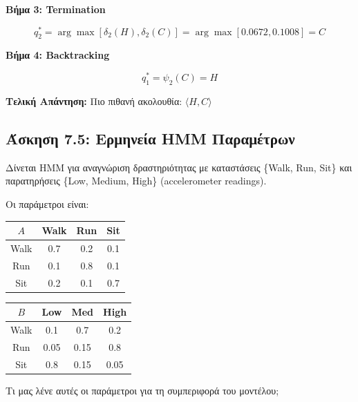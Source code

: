 \textbf{Βήμα 3: Termination}

$$q_2^* = \arg\max[\delta_2(H), \delta_2(C)] = \arg\max[0.0672, 0.1008] = C$$

\textbf{Βήμα 4: Backtracking}

$$q_1^* = \psi_2(C) = H$$

\textbf{Τελική Απάντηση:} Πιο πιθανή ακολουθία: $\langle H, C \rangle$

\begin{center}
\end{center}

\subsection{Άσκηση 7.5: Ερμηνεία HMM Παραμέτρων}

\begin{formulabox}[Εκφώνηση]
Δίνεται HMM για αναγνώριση δραστηριότητας με καταστάσεις \{Walk, Run, Sit\} και
παρατηρήσεις \{Low, Medium, High\} (accelerometer readings).

Οι παράμετροι είναι:
\begin{center}
\begin{tabular}{c|ccc}
$A$ & Walk & Run & Sit \\
\hline
Walk & 0.7 & 0.2 & 0.1 \\
Run & 0.1 & 0.8 & 0.1 \\
Sit & 0.2 & 0.1 & 0.7 \\
\end{tabular}
\quad
\begin{tabular}{c|ccc}
$B$ & Low & Med & High \\
\hline
Walk & 0.1 & 0.7 & 0.2 \\
Run & 0.05 & 0.15 & 0.8 \\
Sit & 0.8 & 0.15 & 0.05 \\
\end{tabular}
\end{center}

Τι μας λένε αυτές οι παράμετροι για τη συμπεριφορά του μοντέλου;
\end{formulabox}

